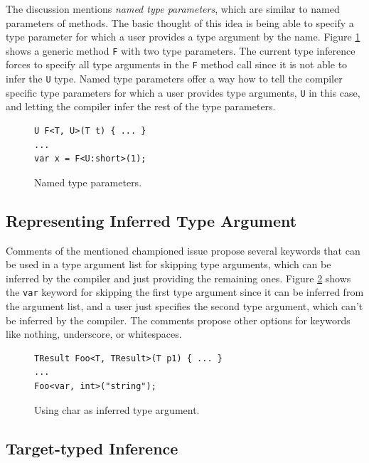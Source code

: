 The discussion \cite{online:NamedTypeParam} mentions \textit{named type parameters}, which are similar to named parameters of methods. 
The basic thought of this idea is being able to specify a type parameter for which a user provides a type argument by the name. 
Figure \ref{img21:NamedTParam} shows a generic method \texttt{F} with two type parameters. 
The current type inference forces to specify all type arguments in the \texttt{F} method call since it is not able to infer the \texttt{U} type. 
Named type parameters offer a way how to tell the compiler specific type parameters for which a user provides type arguments, \texttt{U} in this case, and letting the compiler infer the rest of the type parameters.
\begin{figure}[h]
\begin{lstlisting}[style=csharp]
U F<T, U>(T t) { ... }
...
var x = F<U:short>(1);
\end{lstlisting}
\caption{Named type parameters.}
\label{img21:NamedTParam}
\end{figure}

\subsection{Representing Inferred Type Argument} \label{sect10:is4}

Comments of the mentioned championed issue \cite{online:champion} propose several keywords that can be used in a type argument list for skipping type arguments, which can be inferred by the compiler and just providing the remaining ones.
Figure \ref{img22:CharITArg} shows the \texttt{var} keyword for skipping the first type argument since it can be inferred from the argument list, and a user just specifies the second type argument, which can’t be inferred by the compiler. 
The comments propose other options for keywords like nothing, underscore, or whitespaces.
\begin{figure}[h]
\begin{lstlisting}[style=csharp]
TResult Foo<T, TResult>(T p1) { ... }
...
Foo<var, int>("string");
\end{lstlisting}
\caption{Using char as inferred type argument.}
\label{img22:CharITArg}
\end{figure}

\subsection{Target-typed Inference} \label{sect06:targetType}

